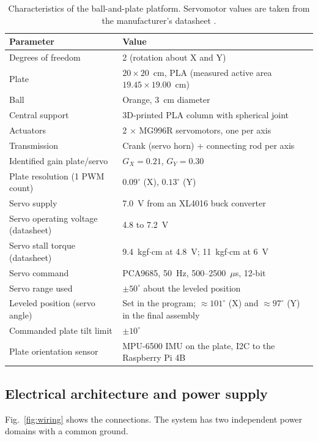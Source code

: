 \documentclass[11pt,letterpaper]{article}
\begin{document}
\begin{table}[H]
\centering
\caption{Characteristics of the ball-and-plate platform. Servomotor
values are taken from the manufacturer's datasheet \cite{MG996R}.}
\label{tab:platform}
\small
\begin{tabularx}{\textwidth}{@{}L{5.6cm} Y@{}}
\toprule
\textbf{Parameter} & \textbf{Value} \\
\midrule
Degrees of freedom & 2 (rotation about X and Y) \\
Plate & $20 \times 20$~cm, PLA (measured active area $19.45 \times 19.00$~cm) \\
Ball & Orange, 3~cm diameter \\
Central support & 3D-printed PLA column with spherical joint \\
Actuators & 2 $\times$ MG996R servomotors, one per axis \\
Transmission & Crank (servo horn) + connecting rod per axis \\
Identified gain plate/servo & $G_X=0.21$, $G_Y=0.30$ \\
Plate resolution (1 PWM count) & $0.09^\circ$ (X), $0.13^\circ$ (Y) \\
Servo supply & 7.0~V from an XL4016 buck converter \\
Servo operating voltage (datasheet) & 4.8 to 7.2~V \\
Servo stall torque (datasheet) & 9.4~kgf$\cdot$cm at 4.8~V; 11~kgf$\cdot$cm at 6~V \\
Servo command & PCA9685, 50~Hz, 500--2500~$\mu$s, 12-bit \\
Servo range used & $\pm 50^\circ$ about the leveled position \\
Leveled position (servo angle) & Set in the program; $\approx101^\circ$ (X) and $\approx97^\circ$ (Y) in the final assembly \\
Commanded plate tilt limit & $\pm 10^\circ$ \\
Plate orientation sensor & MPU-6500 IMU on the plate, I2C to the Raspberry Pi 4B \\
\bottomrule
\end{tabularx}
\end{table}

\subsection{Electrical architecture and power supply}
\label{sec:power}
Fig.~\ref{fig:wiring} shows the connections. The system has two
independent power domains with a common ground.
\end{document}
